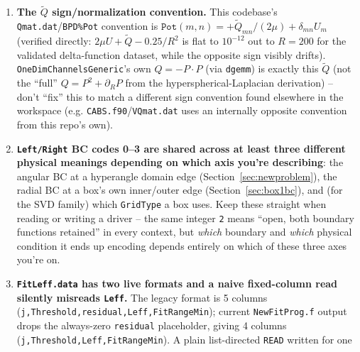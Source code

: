 \documentclass[11pt]{article}
\newcommand{\file}[1]{\texttt{#1}}
\newcommand{\sub}[1]{\texttt{#1}}
\begin{document}
\begin{enumerate}[leftmargin=*]
{  angle $\phi_{23}=\pi/6$ is \emph{strictly interior} to the domain.} If a symmetry-reduced
  domain's right edge coincides with $\phi_{23}$ exactly, the standard segment-3 degenerate-width
  guard produces a \emph{reversed} (negative-width) segment instead of gracefully shrinking to
  zero, corrupting the B-spline knot vector (non-monotonic) and crashing ARPACK/LAPACK downstream
  with no direct clue pointing at the grid maker. Fixed in both repos' copies of
  \file{adiabaticSolver1D.f90} with an explicit \texttt{xMax\ .le.\ phi23} special case (falls
  back to a plain 2-segment coarse+refined-near-edge split); confirmed a no-op for the existing
  validated wide-domain case.
\item \textbf{The $\tilde Q$ sign/normalization convention.} This codebase's
  \texttt{Qmat.dat}/\texttt{BPD\%Pot} convention is $\texttt{Pot}(m,n)=+\tilde Q_{mn}/(2\mu)+
  \delta_{mn}U_m$ (verified directly: $2\mu U+\tilde Q-0.25/R^2$ is flat to $10^{-12}$ out to
  $R=200$ for the validated delta-function dataset, while the opposite sign visibly drifts).
  \sub{OneDimChannelsGeneric}'s own $Q=-P\cdot P$ (via \texttt{dgemm}) is exactly this $\tilde Q$
  (not the ``full'' $Q=P^2+\partial_R P$ from the hyperspherical-Laplacian derivation) -- don't
  ``fix'' this to match a different sign convention found elsewhere in the workspace (e.g.
  \file{CABS.f90}/\texttt{VQmat.dat} uses an internally opposite convention from this repo's own).
\item \textbf{\texttt{Left/Right} BC codes 0--3 are shared across at least three different physical
  meanings depending on which axis you're describing}: the angular BC at a hyperangle domain edge
  (Section~\ref{sec:newproblem}), the radial BC at a box's own inner/outer edge
  (Section~\ref{sec:box1bc}), and (for the SVD family) which \texttt{GridType} a box uses. Keep
  these straight when reading or writing a driver -- the same integer \texttt{2} means ``open,
  both boundary functions retained'' in every context, but \emph{which} boundary and \emph{which}
  physical condition it ends up encoding depends entirely on which of these three axes you're on.
\item \textbf{\texttt{FitLeff.data} has two live formats and a naive fixed-column read silently
  misreads \texttt{Leff}.} The legacy format is 5 columns
  (\texttt{j,Threshold,residual,Leff,FitRangeMin}); current \file{NewFitProg.f} output drops the
  always-zero \texttt{residual} placeholder, giving 4 columns
  (\texttt{j,Threshold,Leff,FitRangeMin}). A plain list-directed \texttt{READ} written for one

\end{enumerate}
\end{document}
